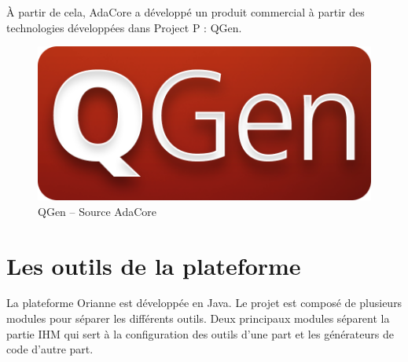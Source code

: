 À partir de cela, AdaCore a développé un produit commercial à partir des
technologies développées dans Project P : QGen.

\begin{figure}[h]
  \centering
  \includegraphics[scale=0.2]{images/qgen}
  \caption{QGen -- Source AdaCore}
  \label{fig:qgen}
\end{figure}

\section{Les outils de la plateforme}
La plateforme Orianne est développée en Java. Le projet est composé de plusieurs modules pour séparer les différents outils.
Deux principaux modules séparent la partie IHM qui sert à la configuration des outils d'une part et les générateurs de code d'autre part.
